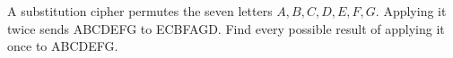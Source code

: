 A substitution cipher permutes the seven letters $A,B,C,D,E,F,G$. Applying it twice sends ABCDEFG to ECBFAGD. Find every possible result of applying it once to ABCDEFG.
